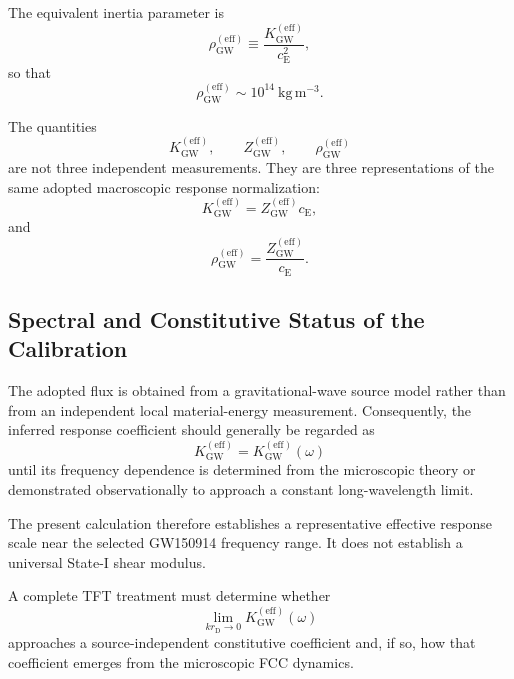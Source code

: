 The equivalent inertia parameter is
\begin{equation}
    \rho_{\mathrm{GW}}^{(\mathrm{eff})} \equiv \frac{ K_{\mathrm{GW}}^{(\mathrm{eff})} }{ c_{\mathrm{E}}^2 },
\end{equation}
so that
\begin{equation}
    \rho_{\mathrm{GW}}^{(\mathrm{eff})} \sim 10^{14}\ \mathrm{kg\,m^{-3}}.
\end{equation}

The quantities
\begin{equation}
    K_{\mathrm{GW}}^{(\mathrm{eff})}, \qquad Z_{\mathrm{GW}}^{(\mathrm{eff})}, \qquad \rho_{\mathrm{GW}}^{(\mathrm{eff})}
\end{equation}
are not three independent measurements. They are three representations of the same adopted macroscopic response normalization:
\begin{equation}
    K_{\mathrm{GW}}^{(\mathrm{eff})} = Z_{\mathrm{GW}}^{(\mathrm{eff})}c_{\mathrm{E}},
\end{equation}
and
\begin{equation}
    \rho_{\mathrm{GW}}^{(\mathrm{eff})} = \frac{ Z_{\mathrm{GW}}^{(\mathrm{eff})} }{ c_{\mathrm{E}} }.
\end{equation}

\subsection*{Spectral and Constitutive Status of the Calibration}

The adopted flux is obtained from a gravitational-wave source model rather than from an independent local material-energy measurement. Consequently, the inferred response coefficient should generally be regarded as
\begin{equation}
    K_{\mathrm{GW}}^{(\mathrm{eff})} = K_{\mathrm{GW}}^{(\mathrm{eff})}(\omega)
\end{equation}
until its frequency dependence is determined from the microscopic theory or demonstrated observationally to approach a constant long-wavelength limit.

The present calculation therefore establishes a representative effective response scale near the selected GW150914 frequency range. It does not establish a universal State-I shear modulus.

A complete TFT treatment must determine whether
\begin{equation}
    \lim_{kr_{\mathrm{D}}\rightarrow0} K_{\mathrm{GW}}^{(\mathrm{eff})}(\omega)
\end{equation}
approaches a source-independent constitutive coefficient and, if so, how that coefficient emerges from the microscopic FCC dynamics.

